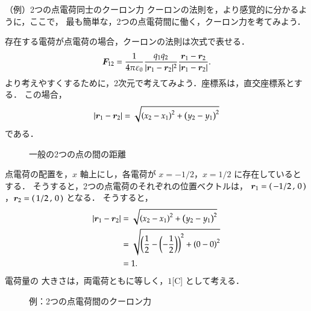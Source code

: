     \begin{memo}{（例）2つの点電荷同士のクーロン力}
    クーロンの法則を，より感覚的に分かるように，ここで，
    最も簡単な，2つの点電荷間に働く，クーロン力を考てみよう．

    存在する電荷が点電荷の場合，クーロンの法則は次式で表せる．
            \begin{align}
                \boldsymbol{F}_{12}=\frac{1}{4\pi\varepsilon_{0}}
                \frac{q_{1}q_{2}}{|\boldsymbol{r}_{1}-\boldsymbol{r}_{2}|^{2}}
                \frac{\boldsymbol{r}_{1}-\boldsymbol{r}_{2}}
                     {|\boldsymbol{r}_{1}-\boldsymbol{r}_{2}|}.
            \end{align}
    より考えやすくするために，2次元で考えてみよう．座標系は，直交座標系とする．
    この場合，
        \begin{equation*}
            |\boldsymbol{r}_{1}-\boldsymbol{r}_{2}| = \sqrt{ {\left(x_{2} - x_{1}\right)}^{2}
            + {\left(y_{2} - y_{1}\right)}^{2} }
        \end{equation*}
    である．
        \begin{figure}[hbt]
            \begin{center}
                \caption{一般の2つの点の間の距離}
                \label{fig:2point_distance}
            \end{center}
        \end{figure}


    点電荷の配置を，$x$ 軸上にし，各電荷が $x=-1/2$，$x=1/2$ に存在しているとする．
    そうすると，2つの点電荷のそれぞれの位置ベクトルは，
    $\boldsymbol{r}_{1}  =  ( \,-1/2\,,\,0\, )$，$\boldsymbol{r}_{2}  =  ( \,1/2\,,\,0\, )$ となる．
    そうすると，
            \begin{align*}
                |\boldsymbol{r}_{1}-\boldsymbol{r}_{2}|
                &= \sqrt{ {\left(x_{2} - x_{1}\right)}^{2} + {\left(y_{2} - y_{1}\right)}^{2} } \\
                &= \sqrt{ {\left(\frac{1}{2} - \left(-\frac{1}{2}\right)\right)}^{2} + {\left(0-0\right)}^{2} } \\
                &= 1.
            \end{align*}
    電荷量の
    大きさは，両電荷ともに等しく，$1$[C] として考える．
        \begin{figure}[hbt]
            \begin{center}
                \caption{例：2つの点電荷間のクーロン力}
                \label{fig:example_Coulombs_low1}
            \end{center}
        \end{figure}


\end{memo}
